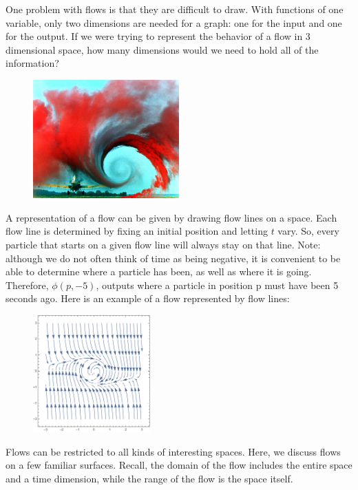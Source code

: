 One problem with flows is that they are difficult to draw. With functions of one variable, only two dimensions are needed for a graph: one for the input and one for the output. If we were trying to represent the behavior of a flow in 3 dimensional space, how many dimensions would we need to hold all of the information? \\
	\begin{figure}[H]
	\centering
	\includegraphics[width=0.5\textwidth]{season2/204/images/vortexflow.jpg} 
	\end{figure}
A representation of a flow can be given by drawing flow lines on a space. Each flow line is determined by fixing an initial position and letting $t$ vary. So, every particle that starts on a given flow line will always stay on that line. Note: although we do not often think of time as being negative, it is convenient to be able to determine where a particle has been, as well as where it is going. Therefore, $\phi(p,-5)$, outputs where a particle in position p must have been 5 seconds ago. Here is an example of a flow represented by flow lines:
	\begin{figure}[H]
	   \centering
	   \includegraphics[width=0.4\textwidth]{season2/204/images/flow.png} 
	\end{figure}
Flows can be restricted to all kinds of interesting spaces. Here, we discuss flows on a few familiar surfaces. Recall, the domain of the flow includes the entire space and a time dimension, while the range of the flow is the space itself. \\

